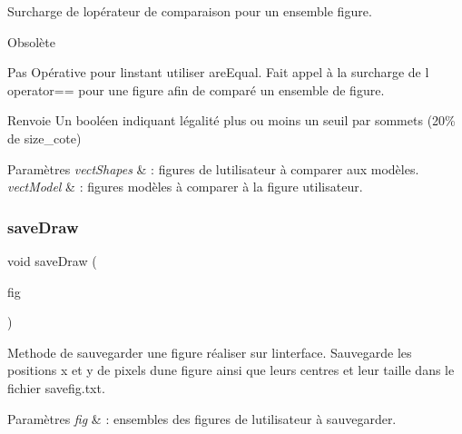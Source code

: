Surcharge de l\textquotesingle{}opérateur de comparaison pour un ensemble figure. 

\begin{DoxyRefDesc}{Obsolète}
\item[\hyperlink{deprecated__deprecated000001}{Obsolète}]Pas Opérative pour l\textquotesingle{}instant utiliser are\+Equal. Fait appel à la surcharge de l\textquotesingle{} operator== pour une figure afin de comparé un ensemble de figure. \end{DoxyRefDesc}
\begin{DoxyReturn}{Renvoie}
Un booléen indiquant l\textquotesingle{}égalité plus ou moins un seuil par sommets (20\% de size\+\_\+cote) 
\end{DoxyReturn}

\begin{DoxyParams}{Paramètres}
{\em vect\+Shapes} & \+: figures de l\textquotesingle{}utilisateur à comparer aux modèles. \\
\hline
{\em vect\+Model} & \+: figures modèles à comparer à la figure utilisateur. \\
\hline
\end{DoxyParams}
\mbox{\label{classgeometric_shape_1_1_shape_a011759ae83f40587e0f422f2730ecbd4}} 
\subsubsection{\texorpdfstring{save\+Draw}{saveDraw}}
{\footnotesize\ttfamily void save\+Draw (\begin{DoxyParamCaption}\item[{const std\+::vector$<$ std\+::shared\+\_\+ptr$<$ \hyperlink{classgeometric_shape_1_1_shape}{geometric\+Shape\+::\+Shape} $>$$>$ \&}]{fig }\end{DoxyParamCaption})\hspace{0.3cm}{\ttfamily [friend]}}



Methode de sauvegarder une figure réaliser sur l\textquotesingle{}interface. Sauvegarde les positions x et y de pixels d\textquotesingle{}une figure ainsi que leurs centres et leur taille dans le fichier savefig.\+txt. 


\begin{DoxyParams}{Paramètres}
{\em fig} & \+: ensembles des figures de l\textquotesingle{}utilisateur à sauvegarder. \\
\hline
\end{DoxyParams}


